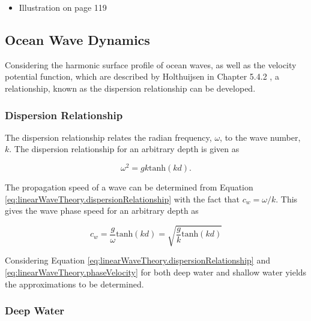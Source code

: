 \begin{itemize}
    \item Illustration on page 119
\end{itemize}


\subsection{Ocean Wave Dynamics} \label{subsec:theory.waves.dynamics}

Considering the harmonic surface profile of ocean waves, as well as the velocity potential function, which are described by Holthuijsen in Chapter 5.4.2 \cite{Holthuijsen2007}, a relationship, known as the dispersion relationship can be developed.

\subsubsection{Dispersion Relationship} \label{subsec:theory.waves.dynamics.dispersionRelationship}

The dispersion relationship relates the radian frequency, $\omega$, to the wave number, $k$. The dispersion relationship for an arbitrary depth is given as

\begin{equation} \label{eq:linearWaveTheory.dispersionRelationship}
    \omega ^2 = gk\text{tanh}(kd).
\end{equation}

The propagation speed of a wave can be determined from Equation \ref{eq:linearWaveTheory.dispersionRelationship} with the fact that $c_{w} = \omega / k$. This gives the wave phase speed for an arbitrary depth as

\begin{equation} \label{eq:linearWaveTheory.phaseVelocity}
    c_{w} = \frac{g}{\omega}\text{tanh}(kd) = \sqrt{\frac{g}{k}\text{tanh}(kd)}
\end{equation}

Considering Equation \ref{eq:linearWaveTheory.dispersionRelationship} and \ref{eq:linearWaveTheory.phaseVelocity} for both deep water and shallow water yields the approximations to be determined.

\subsubsection{Deep Water} \label{subsec:theory.waves.linearWaveTheory.deepWater}

